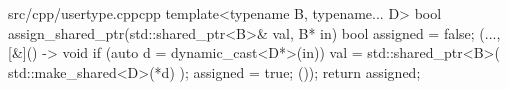 \begin{fileminted}{src/cpp/usertype.cpp}{cpp}
template<typename B, typename... D>
bool assign_shared_ptr(std::shared_ptr<B>& val, B* in) {
    bool assigned = false;
    (..., [&]() -> void {
        if (auto d = dynamic_cast<D*>(in)) {
            val = std::shared_ptr<B>(
                std::make_shared<D>(*d)
            );
            assigned = true;
        }
    }());
    return assigned;
} 
\end{fileminted}